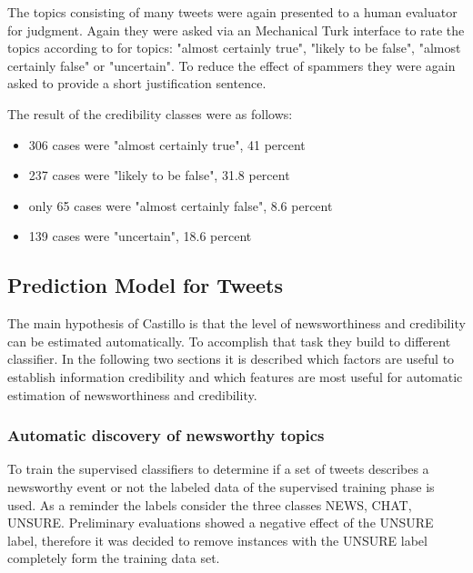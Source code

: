 \documentclass{proseminar}
\let\i\undefined
\newcommand{\i}[1]{\emph{#1}}
\begin{document}
The topics consisting of many tweets were again presented to a human evaluator for judgment. Again they were asked via an Mechanical Turk interface to rate the topics according to for topics: "almost certainly true", "likely to be false", "almost certainly false" or "uncertain". To reduce the effect of spammers they were again asked to provide a short justification sentence. 

The result of the credibility classes were as follows:
\begin{itemize}
\item 306 cases were "almost certainly true", 41 percent
\item 237 cases were "likely to be false", 31.8 percent
\item only 65 cases were "almost certainly false", 8.6 percent
\item 139 cases were "uncertain", 18.6 percent
\end{itemize}

\subsection{Prediction Model for Tweets}
The main hypothesis of Castillo \i{et al.} is that the level of newsworthiness and credibility can be estimated automatically. To accomplish that task they build to different classifier. In the following two sections it is described which factors are useful to establish  information credibility and which features are most useful for automatic estimation of newsworthiness and credibility.


\subsubsection*{Automatic discovery of newsworthy topics}
To train the supervised classifiers to determine if a set of tweets describes a newsworthy event or not the labeled data of the supervised training phase is used. As a reminder the labels consider the three classes NEWS, CHAT, UNSURE. Preliminary evaluations showed a negative effect of the UNSURE label, therefore it was decided to remove instances with the UNSURE label completely form the training data set.
\end{document}
